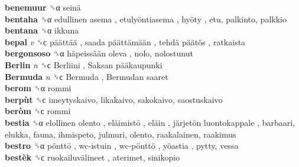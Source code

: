 \textbf{benemuur} ␝α   seinä   \\
\textbf{bentaha} ␝α   edullinen asema ,  etulyöntiasema ,  hyöty , etu, palkinto, palkkio  \\
\textbf{bentana} ␝α  ikkuna  \\
\textbf{bepal} \emph{v}  ␝ϲ   päättää ,  saada päättämään ,  tehdä päätös , ratkaista  \\
\textbf{bergonsoso} ␝α   häpeissään oleva , nolo, nolostunut  \\
\textbf{Berlin} \emph{n}  ␝ϲ   Berliini ,  Saksan pääkaupunki   \\
\textbf{Bermuda} \emph{n}  ␝ϲ   Bermuda ,  Bermudan saaret   \\
\textbf{berom} ␝α  rommi  \\
\textbf{berpùt} ␝ϲ  imeytyskaivo, likakaivo, sakokaivo, saostuskaivo  \\
\textbf{beròm} ␝ϲ  rommi  \\
\textbf{bestia} ␝α   elollinen olento ,  eläimistö ,  eläin ,  järjetön luontokappale , barbaari, elukka, fauna, ihmispeto, julmuri, olento, raakalainen, raakimus  \\
\textbf{bestro} ␝α   pönttö ,  wc-istuin ,  wc-pönttö ,  yöastia , pytty, vessa  \\
\textbf{bestèk} ␝ϲ   ruokailuvälineet , aterimet, sinikopio  \\
